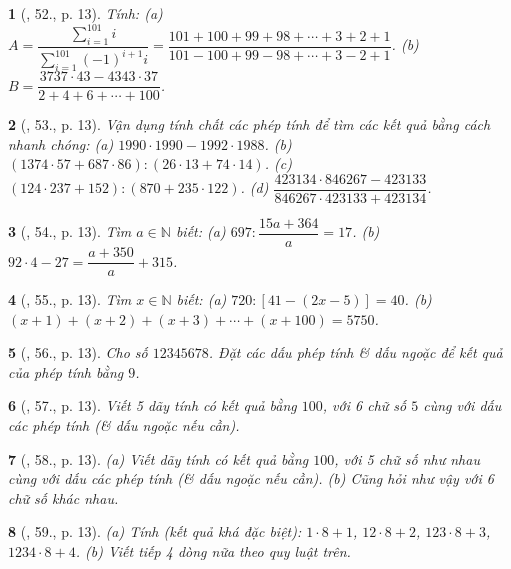 \documentclass{article}
\newtheorem{baitoan}{}
\begin{document}
\begin{baitoan}[\cite{Binh_Toan_6_tap_1}, 52., p. 13]
	Tính: (a) $A = \dfrac{\sum_{i=1}^{101} i}{\sum_{i=1}^{101} (-1)^{i+1}i} = \dfrac{101 + 100 + 99 + 98 + \cdots + 3 + 2 + 1}{101 - 100 + 99 - 98 + \cdots + 3 - 2 + 1}$. (b) $B = \dfrac{3737\cdot43 - 4343\cdot37}{2 + 4 + 6 + \cdots + 100}$.
\end{baitoan}

\begin{baitoan}[\cite{Binh_Toan_6_tap_1}, 53., p. 13]
	Vận dụng tính chất các phép tính để tìm các kết quả bằng cách nhanh chóng: (a) $1990\cdot1990 - 1992\cdot1988$. (b) $(1374\cdot57 + 687\cdot86):(26\cdot13 + 74\cdot14)$. (c) $(124\cdot237 + 152):(870 + 235\cdot122)$. (d) $\dfrac{423134\cdot846267 - 423133}{846267\cdot423133 + 423134}$.
\end{baitoan}

\begin{baitoan}[\cite{Binh_Toan_6_tap_1}, 54., p. 13]
	Tìm $a\in\mathbb{N}$ biết: (a) $697:\dfrac{15a + 364}{a} = 17$. (b) $92\cdot4 - 27 = \dfrac{a + 350}{a} + 315$.
\end{baitoan}

\begin{baitoan}[\cite{Binh_Toan_6_tap_1}, 55., p. 13]
	Tìm $x\in\mathbb{N}$ biết: (a) $720:[41 - (2x - 5)] = 40$. (b) $(x + 1) + (x + 2) + (x + 3) + \cdots + (x + 100) = 5750$.
\end{baitoan}

\begin{baitoan}[\cite{Binh_Toan_6_tap_1}, 56., p. 13]
	Cho số $12345678$. Đặt các dấu phép tính \& dấu ngoặc để kết quả của phép tính bằng $9$.
\end{baitoan}

\begin{baitoan}[\cite{Binh_Toan_6_tap_1}, 57., p. 13]
	Viết 5 dãy tính có kết quả bằng $100$, với 6 chữ số $5$ cùng với dấu các phép tính (\& dấu ngoặc nếu cần).
\end{baitoan}

\begin{baitoan}[\cite{Binh_Toan_6_tap_1}, 58., p. 13]
	(a) Viết dãy tính có kết quả bằng $100$, với 5 chữ số như nhau cùng với dấu các phép tính (\& dấu ngoặc nếu cần). (b) Cũng hỏi như vậy với 6 chữ số khác nhau.
\end{baitoan}

\begin{baitoan}[\cite{Binh_Toan_6_tap_1}, 59., p. 13]
	(a) Tính (kết quả khá đặc biệt): $1\cdot8 + 1$, $12\cdot8 + 2$, $123\cdot8 + 3$, $1234\cdot8 + 4$. (b) Viết tiếp 4 dòng nữa theo quy luật trên.
\end{baitoan}
\end{document}
